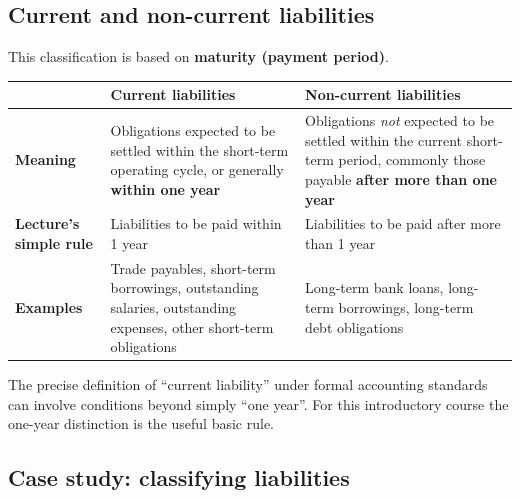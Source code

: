 \documentclass[11pt,a4paper]{article}
\begin{document}
\subsection{Current and non-current liabilities}

This classification is based on \textbf{maturity (payment period)}.

\begin{center}
\small
\begin{tabularx}{\textwidth}{@{}l Y Y@{}}
\toprule
{} & \textbf{Current liabilities} & \textbf{Non-current liabilities}\\
\midrule
\textbf{Meaning} & Obligations expected to be settled within the short-term operating cycle, or generally \textbf{within one year} & Obligations \emph{not} expected to be settled within the current short-term period, commonly those payable \textbf{after more than one year}\\
\textbf{Lecture's simple rule} & Liabilities to be paid within 1 year & Liabilities to be paid after more than 1 year\\
\textbf{Examples} & Trade payables, short-term borrowings, outstanding salaries, outstanding expenses, other short-term obligations & Long-term bank loans, long-term borrowings, long-term debt obligations\\
\bottomrule
\end{tabularx}
\end{center}

\begin{impbox}
The precise definition of ``current liability'' under formal accounting standards can involve conditions
beyond simply ``one year''. For this introductory course the one-year distinction is the useful basic rule.
\end{impbox}

\subsection{Case study: classifying liabilities}
\end{document}
